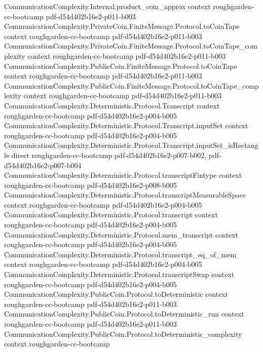 \begin{theorem}
\proofstep
  {CommunicationComplexity.Internal.product_coin_approx}
  {context}
  {roughgarden-cc-bootcamp}
  {pdf-d54d402b16e2-p011-b003}
\proofstep
  {CommunicationComplexity.PrivateCoin.FiniteMessage.Protocol.toCoinTape}
  {context}
  {roughgarden-cc-bootcamp}
  {pdf-d54d402b16e2-p011-b003}
\proofstep
  {CommunicationComplexity.PrivateCoin.FiniteMessage.Protocol.toCoinTape_complexity}
  {context}
  {roughgarden-cc-bootcamp}
  {pdf-d54d402b16e2-p011-b003}
\proofstep
  {CommunicationComplexity.PublicCoin.FiniteMessage.Protocol.toCoinTape}
  {context}
  {roughgarden-cc-bootcamp}
  {pdf-d54d402b16e2-p011-b003}
\proofstep
  {CommunicationComplexity.PublicCoin.FiniteMessage.Protocol.toCoinTape_complexity}
  {context}
  {roughgarden-cc-bootcamp}
  {pdf-d54d402b16e2-p011-b003}
\proofstep
  {CommunicationComplexity.Deterministic.Protocol.Transcript}
  {context}
  {roughgarden-cc-bootcamp}
  {pdf-d54d402b16e2-p004-b005}
\proofstep
  {CommunicationComplexity.Deterministic.Protocol.Transcript.inputSet}
  {context}
  {roughgarden-cc-bootcamp}
  {pdf-d54d402b16e2-p004-b005}
\proofstep
  {CommunicationComplexity.Deterministic.Protocol.Transcript.inputSet_isRectangle}
  {direct}
  {roughgarden-cc-bootcamp}
  {pdf-d54d402b16e2-p007-b002,
    pdf-d54d402b16e2-p007-b004}
\proofstep
  {CommunicationComplexity.Deterministic.Protocol.transcriptFintype}
  {context}
  {roughgarden-cc-bootcamp}
  {pdf-d54d402b16e2-p008-b005}
\proofstep
  {CommunicationComplexity.Deterministic.Protocol.transcriptMeasurableSpace}
  {context}
  {roughgarden-cc-bootcamp}
  {pdf-d54d402b16e2-p004-b005}
\proofstep
  {CommunicationComplexity.Deterministic.Protocol.transcript}
  {context}
  {roughgarden-cc-bootcamp}
  {pdf-d54d402b16e2-p004-b005}
\proofstep
  {CommunicationComplexity.Deterministic.Protocol.mem_transcript}
  {context}
  {roughgarden-cc-bootcamp}
  {pdf-d54d402b16e2-p004-b005}
\proofstep
  {CommunicationComplexity.Deterministic.Protocol.transcript_eq_of_mem}
  {context}
  {roughgarden-cc-bootcamp}
  {pdf-d54d402b16e2-p004-b005}
\proofstep
  {CommunicationComplexity.Deterministic.Protocol.transcriptSwap}
  {context}
  {roughgarden-cc-bootcamp}
  {pdf-d54d402b16e2-p004-b005}
\proofstep
  {CommunicationComplexity.PublicCoin.Protocol.toDeterministic}
  {context}
  {roughgarden-cc-bootcamp}
  {pdf-d54d402b16e2-p011-b003}
\proofstep
  {CommunicationComplexity.PublicCoin.Protocol.toDeterministic_run}
  {context}
  {roughgarden-cc-bootcamp}
  {pdf-d54d402b16e2-p011-b003}
\proofstep
  {CommunicationComplexity.PublicCoin.Protocol.toDeterministic_complexity}
  {context}
  {roughgarden-cc-bootcamp}

\end{theorem}

